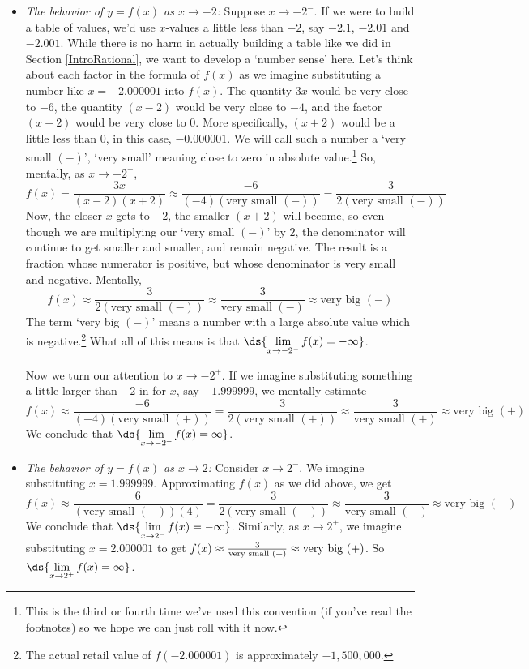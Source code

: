 \documentclass{ximera}
\begin{document}
\begin{example}
\begin{enumerate}
\begin{itemize}
\item  \textit{The behavior of $y=f(x)$ as $x \rightarrow -2$:}  Suppose $x \rightarrow -2^{-}$.  If we were to build a table of values, we'd use $x$-values a little less than $-2$, say $-2.1$, $-2.01$ and $-2.001$.  While there is no harm in actually building a table like we did in Section \ref{IntroRational}, we want to develop a `number sense' here.  Let's think about each factor in the formula of $f(x)$ as we imagine substituting a number like $x=-2.000001$ into $f(x)$. The quantity $3x$ would be very close to $-6$, the quantity $(x-2)$ would be very close to $-4$, and the factor $(x+2)$ would be very close to $0$.  More specifically, $(x+2)$ would be a little less than $0$, in this case, $-0.000001.$  We will call such a number a `very small $(-)$', `very small' meaning close to zero in absolute value.\footnote{This is the third or fourth time we've used this convention (if you've read the footnotes) so we hope we can just roll with it now.}  So, mentally, as $x \rightarrow -2^{-}$, \[ f(x)   = \dfrac{3x}{(x-2)(x+2)} \approx \dfrac{-6}{(-4)\left( \text{very small $(-)$}\right)} = \dfrac{3}{2 \left( \text{very small $(-)$}\right)} \]  Now, the closer $x$ gets to $-2$, the smaller $(x+2)$ will become, so even though we are multiplying our `very small $(-)$' by $2$, the denominator will continue to get smaller and smaller, and remain negative.  The result is a fraction whose numerator is positive, but whose denominator is very small and negative.  Mentally, \[f(x) \approx \dfrac{3}{2 \left( \text{very small $(-)$}\right)} \approx \dfrac{3}{\text{very small $(-)$}} \approx \text{very big $(-)$}\]  The term `very big $(-)$' means a number with a large absolute value which is negative.\footnote{The actual retail value of $f(-2.000001)$ is approximately $-1,\!500,\!000$.}  What all of this means is that  $\ds{ \lim_{x \rightarrow -2^{-}} f(x) = -\infty}$.    

Now we turn our attention to $x \rightarrow -2^{+}$.  If we imagine substituting something a little larger than $-2$ in for $x$, say $-1.999999$, we mentally estimate \[ f(x) \approx \dfrac{-6}{(-4)\left( \text{very small $(+)$}\right)} = \dfrac{3}{2 \left( \text{very small $(+)$}\right)}  \approx \dfrac{3}{\text{very small $(+)$}} \approx \text{very big $(+)$}\]  We conclude that $\ds{ \lim_{x \rightarrow -2^{+}} f(x) = \infty}$.

\item  \textit{The behavior of $y=f(x)$ as $x \rightarrow 2$:} Consider $x \rightarrow 2^{-}$. We imagine substituting $x = 1.999999$.  Approximating $f(x)$ as we did above, we get \[ f(x) \approx \dfrac{6}{\left( \text{very small $(-)$}\right)(4)} = \dfrac{3}{2 \left( \text{very small $(-)$}\right)}  \approx \dfrac{3}{\text{very small $(-)$}} \approx \text{very big $(-)$}\]  We conclude that $\ds{ \lim_{x \rightarrow 2^{-}} f(x) = -\infty}$.  Similarly, as $x \rightarrow 2^{+}$, we imagine substituting $x = 2.000001$ to get $f(x) \approx \frac{3}{\text{\scriptsize very small $(+)$}} \approx \text{very big (+)}$.  So $\ds{ \lim_{x \rightarrow 2^{+}} f(x) = \infty}$.
\end{itemize}


\end{enumerate}
\end{example}
\end{document}
